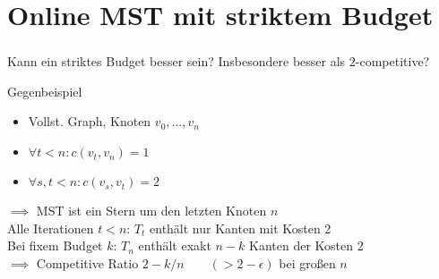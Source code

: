\section{Online MST mit striktem Budget}

\begin{frame}
    \frametitle{\insertsection}
    Kann ein striktes Budget besser sein? Insbesondere besser als $2$-competitive?
    \begin{block}{Gegenbeispiel}
        \vspace{.5em}
        \begin{itemize}
        \item Vollst. Graph, Knoten $v_0,...,v_n$
        \item $\forall t < n: c(v_t, v_n) = 1$
        \item $\forall s, t < n: c(v_s, v_t) = 2$
        \end{itemize}
        $\implies$ MST ist ein Stern um den letzten Knoten $n$\\
        \vspace{1em}
        Alle Iterationen $t < n$: $T_t$ enthält nur Kanten mit Kosten 2\\
        \vspace{1em}
        Bei fixem Budget $k$: $T_n$ enthält exakt $n-k$ Kanten der Kosten 2\\
        \vspace{1em}
        $\implies$ Competitive Ratio $2 - k/n \qquad (> 2 - \epsilon)$ bei großen $n$
    \end{block}
\end{frame}